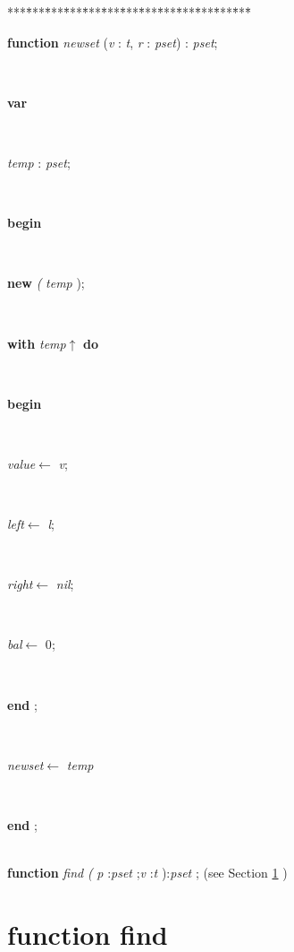 \documentclass[10pt, a4paper]{article}
\begin{document}
\begin{tabbing}
***\=***\=***\=***\=***\=***\=***\=***\=***\=***\=***\=***\=***\=\kill
\parbox{14cm}{\textsf {\textbf {function } \textsf{\textit{newset} (\textit{v} : \textit{t}, \textit{r} : \textit{pset}) : \textit{pset}}; }}\\
\+\parbox{14cm}{\textsf{\textbf{var} }}\\
\parbox{14cm}{\textsf{\textit{temp} : \textit{pset}}; }\\
\-\<\+\parbox{14cm}{\textsf{\textbf{begin} }}\\
\parbox{14cm}{\textsf{\textbf{new} \textit{(} \textit{temp} );}}\\
\+\parbox{14cm}{\textsf {\textbf {with } \textsf{\textit{temp}$\uparrow$\textit{}} \textbf{ do } }}\\
\<\parbox{14cm}{\textsf{\textbf{begin} }}\\
\parbox{14cm}{\textsf{\textit{value}$\leftarrow$ \textit{v}}; }\\
\parbox{14cm}{\textsf{\textit{left}$\leftarrow$ \textit{l}}; }\\
\parbox{14cm}{\textsf{\textit{right}$\leftarrow$ \textit{nil}}; }\\
\parbox{14cm}{\textsf{\textit{bal}$\leftarrow$ 0}; }\\
\<\-\parbox{14cm}{\textsf{\textbf{end} ;}}\\
\parbox{14cm}{\textsf{\textit{newset}$\leftarrow$ \textit{temp}}}\\
\<\-\parbox{14cm}{\textsf{\textbf{end} ;}}\\
\+\textsf{\textbf{function}  \textit{find} \textit{(} \textit{p} :\textit{pset} ;\textit{v} :\textit{t} ):\textit{pset} ;} (see Section \ref{sec:genericset/pointer2pset/setle/setge/setequals/setdifference/rec/setsymetricdifference/setintersection/rec/setunion/rec/isemptyset/emptyset/newsetfind} )\\
\end{tabbing}
\section{function find}\label{sec:genericset/pointer2pset/setle/setge/setequals/setdifference/rec/setsymetricdifference/setintersection/rec/setunion/rec/isemptyset/emptyset/newsetfind}
\end{document}
